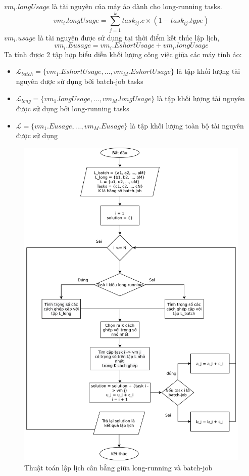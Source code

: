 \documentclass{my_style}
\begin{document}
\noindent
$vm_{i}.longUsage$ là tài nguyên của máy ảo dành cho long-running tasks.
\[
	vm_{i}.longUsage = \sum_{j = 1}^{k}task_{ij}.c \times (1 - task_{ij}.type)
\]
$vm_{i}.usage$ là tài nguyên được sử dụng tại thời điểm kết thúc lập lịch, 
\[
	vm_{i}.Eusage = vm_{i}.EshortUsage + vm_{i}.longUsage
\]
\newpage
Ta tính được 2 tập hợp biểu diễn khối lượng công việc giữa các máy tính ảo: 
\begin{itemize}
	\item $\mathcal{L}_{batch} = \{vm_{1}.EshortUsage, ..., vm_{M}.EshortUsage\}$ là tập khối lượng tài nguyên được sử dụng bởi batch-job tasks 
	\item $\mathcal{L}_{long} = \{vm_{1}.longUsage, ..., vm_{M}.longUsage\}$ là tập khối lượng tài nguyên được sử dụng bởi long-running tasks
	\item $\mathcal{L} = \{vm_{1}.Eusage, ..., vm_{M}.Eusage\}$ là tập khối lượng toàn bộ tài nguyên được sử dụng
\end{itemize}
\begin{figure}[h!]
	\centering
	\includegraphics[scale=0.7]{images/load_balancing_proposal.png}
	\caption{Thuật toán lập lịch cân bằng giữa long-running và batch-job}
	\label{fig:algo3}
\end{figure}
\end{document}
